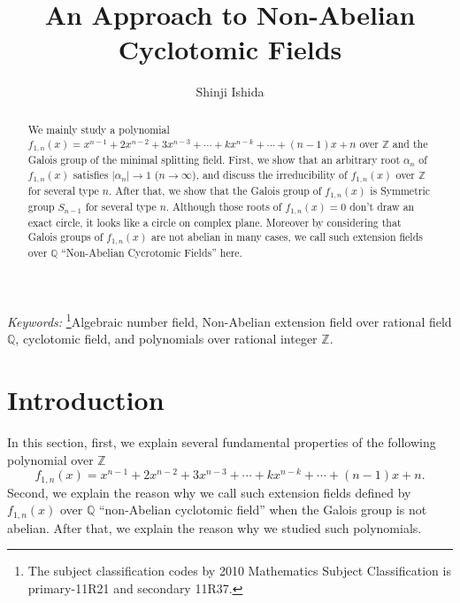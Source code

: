 \documentclass{article}
\title{An Approach to Non-Abelian Cyclotomic Fields}
\author{Shinji Ishida}
\providecommand{\keywords}[1]{{\textit{Keywords:}} #1}
\begin{document}
\maketitle
\begin{abstract}
We mainly study a polynomial $f_{1,n}(x)=x^{n-1} + 2x^{n-2} + 3x^{n-3} + \cdots + kx^{n-k} + \cdots + (n-1)x + n$ over $\mathbb{Z}$ and the Galois group of the minimal splitting field. First, we show that an arbitrary root $\alpha_{n}$ of $f_{1,n}(x)$ satisfies $|\alpha_{n}|\to 1$ ($n\to \infty$), and discuss the irreducibility of $f_{1,n}(x)$ over $\mathbb{Z}$ for several type $n$. After that, we show that the Galois group of $f_{1,n}(x)$ is Symmetric group $S_{n-1}$ for several type $n$. Although those roots of $f_{1,n}(x)=0$ don't draw an exact circle, it looks like a circle on complex plane. Moreover by considering that Galois groups of $f_{1,n}(x)$ are not abelian in many cases, we call such extension fields over $\mathbb{Q}$ ``Non-Abelian Cycrotomic Fields'' here.
\end{abstract}

\keywords\footnote[1]{The subject classification codes by 2010 Mathematics Subject Classification is primary-11R21 and secondary 11R37.}{Algebraic number field, Non-Abelian extension field over rational field $\mathbb{Q}$, cyclotomic field, and polynomials over rational integer $\mathbb{Z}$.}

\tableofcontents
\section{Introduction}
In this section, first, we explain several fundamental properties of the following polynomial over $\mathbb{Z}$
\begin{equation}
f_{1,n}(x)=x^{n-1} + 2x^{n-2} + 3x^{n-3} + \cdots + kx^{n-k} + \cdots + (n-1)x + n.
\end{equation}
Second, we explain the reason why we call such extension fields defined by $f_{1,n}(x)$ over $\mathbb{Q}$ ``non-Abelian cyclotomic field'' when the Galois group is not abelian. After that, we explain the reason why we studied such polynomials.
\\
\end{document}
